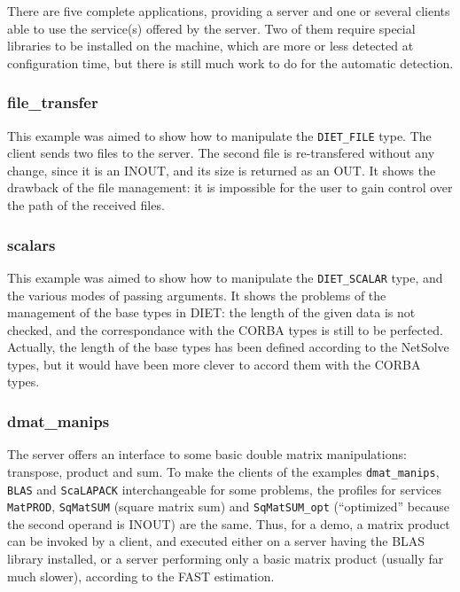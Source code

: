 There are five complete applications, providing a server and one or several
clients able to use the service(s) offered by the server. Two of them require
special libraries to be installed on the machine, which are more or less
detected at configuration time, but there is still much work to do for
the automatic detection.

\subsubsection{file\_transfer}

This example was aimed to show how to manipulate the \texttt{DIET\_FILE} type.
The client sends two files to the server. The second file is re-transfered
without any change, since it is an INOUT, and its size is returned as an OUT.
It shows the drawback of the file management: it is impossible for the user to
gain control over the path of the received files.

\subsubsection{scalars}

This example was aimed to show how to manipulate the \texttt{DIET\_SCALAR} type,
and the various modes of passing arguments. It shows the problems of the
management of the base types in DIET: the length of the given data is not
checked, and the correspondance with the CORBA types is still to be perfected.
Actually, the length of the base types has been defined according to the
NetSolve types, but it would have been more clever to accord them with the CORBA
types. 

\subsubsection{dmat\_manips}

The server offers an interface to some basic double matrix manipulations:
transpose, product and sum. To make the clients of the examples
\texttt{dmat\_manips}, \texttt{BLAS} and \texttt{ScaLAPACK} interchangeable for
some problems, the profiles for services \texttt{MatPROD}, \texttt{SqMatSUM}
(square matrix sum) and \texttt{SqMatSUM\_opt} (``optimized'' because the second
operand is INOUT) are the same. Thus, for a demo, a matrix product can be
invoked by a client, and executed either on a server having the BLAS library
installed, or a server performing only a basic matrix product (usually far much
slower), according to the FAST estimation.
\\

